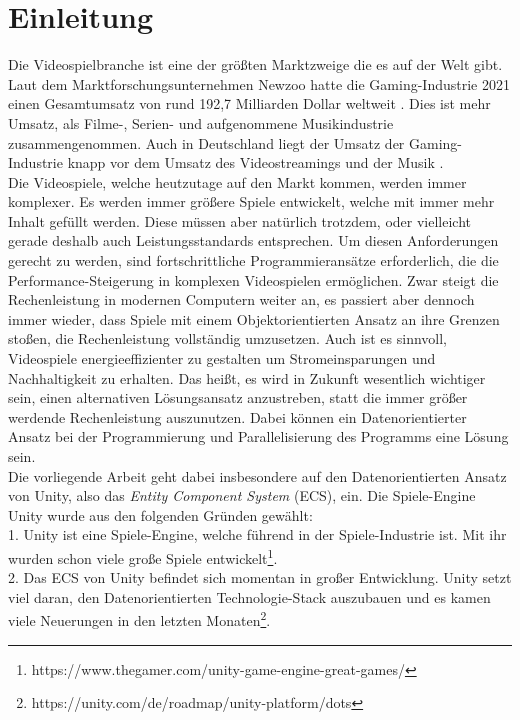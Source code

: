 \section{Einleitung}
Die Videospielbranche ist eine der größten Marktzweige die es auf der Welt gibt. Laut dem Marktforschungsunternehmen Newzoo hatte die Gaming-Industrie 2021 einen Gesamtumsatz von rund 192,7 Milliarden Dollar weltweit \cite{Spiele-Industrie-weltweit}. Dies ist mehr Umsatz, als Filme-, Serien- und aufgenommene Musikindustrie zusammengenommen. Auch in Deutschland liegt der Umsatz der Gaming-Industrie knapp vor dem Umsatz des Videostreamings und der Musik \cite{Spiele-Industrie-deutschland}.\\
Die Videospiele, welche heutzutage auf den Markt kommen, werden immer komplexer. Es werden immer größere Spiele entwickelt, welche mit immer mehr Inhalt gefüllt werden. Diese müssen aber natürlich trotzdem, oder vielleicht gerade deshalb auch Leistungsstandards entsprechen. Um diesen Anforderungen gerecht zu werden, sind fortschrittliche Programmieransätze erforderlich, die die Performance-Steigerung in komplexen Videospielen ermöglichen. Zwar steigt die Rechenleistung in modernen Computern weiter an, es passiert aber dennoch immer wieder, dass Spiele mit einem Objektorientierten Ansatz an ihre Grenzen stoßen, die Rechenleistung vollständig umzusetzen. Auch ist es sinnvoll, Videospiele energieeffizienter zu gestalten um Stromeinsparungen und Nachhaltigkeit zu erhalten. Das heißt, es wird in Zukunft wesentlich wichtiger sein, einen alternativen Lösungsansatz anzustreben, statt die immer größer werdende Rechenleistung auszunutzen. Dabei können ein Datenorientierter Ansatz bei der Programmierung und Parallelisierung des Programms eine Lösung sein.\\
Die vorliegende Arbeit geht dabei insbesondere auf den Datenorientierten Ansatz von Unity, also das \textit{Entity Component System} (ECS), ein. Die Spiele-Engine Unity wurde aus den folgenden Gründen gewählt:\\
1. Unity ist eine Spiele-Engine, welche führend in der Spiele-Industrie ist. Mit ihr wurden schon viele große Spiele entwickelt\footnote{https://www.thegamer.com/unity-game-engine-great-games/}.\\
2. Das ECS von Unity befindet sich momentan in großer Entwicklung. Unity setzt viel daran, den Datenorientierten Technologie-Stack auszubauen und es kamen viele Neuerungen in den letzten Monaten\footnote{https://unity.com/de/roadmap/unity-platform/dots}.